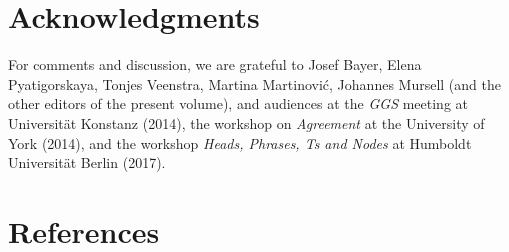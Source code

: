 \documentclass[output=paper
,modfonts
,nonflat]{langsci/langscibook}
\begin{document}
\section*{Acknowledgments}

For comments and discussion, we are grateful to Josef Bayer, Elena
Pyatigorskaya, Tonjes Veenstra, Martina Martinovi\'c, Johannes Mursell
(and the other editors of the present volume), and audiences at the
{\it GGS} meeting at Universit{\"a}t Konstanz (2014), the workshop on
{\it Agreement} at the University of York (2014), and the workshop
{\it Heads, Phrases, Ts and Nodes} at Humboldt Universit{\"a}t Berlin (2017).


\section*{References}




\end{document}
